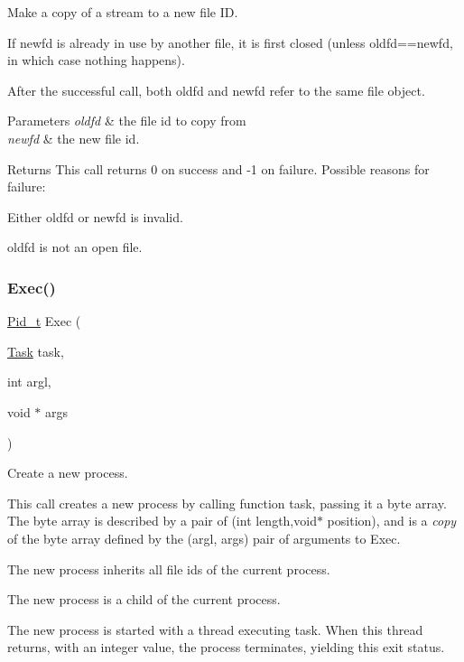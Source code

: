 Make a copy of a stream to a new file ID. 

If {\ttfamily newfd} is already in use by another file, it is first closed (unless {\ttfamily oldfd==newfd}, in which case nothing happens).

After the successful call, both oldfd and newfd refer to the same file object.


\begin{DoxyParams}{Parameters}
{\em oldfd} & the file id to copy from \\
\hline
{\em newfd} & the new file id. \\
\hline
\end{DoxyParams}
\begin{DoxyReturn}{Returns}
This call returns 0 on success and -\/1 on failure. Possible reasons for failure\+:
\begin{DoxyItemize}
\item Either oldfd or newfd is invalid.
\item oldfd is not an open file. 
\end{DoxyItemize}
\end{DoxyReturn}
\mbox{\label{group__syscalls_ga737ad30d8105b4b76e3eb102dd016404}} 
\subsubsection{\texorpdfstring{Exec()}{Exec()}}
{\footnotesize\ttfamily \hyperlink{group__syscalls_gafac07f3170763932fac97b6eab2c3984}{Pid\+\_\+t} Exec (\begin{DoxyParamCaption}\item[{\hyperlink{group__syscalls_gaec3f2f835e105271fbbc00272c0ba984}{Task}}]{task,  }\item[{int}]{argl,  }\item[{void $\ast$}]{args }\end{DoxyParamCaption})}



Create a new process. 

This call creates a new process by calling function {\ttfamily task}, passing it a byte array. The byte array is described by a pair of (int length,void$\ast$ position), and is a {\itshape copy} of the byte array defined by the (argl, args) pair of arguments to Exec.


\begin{DoxyItemize}
\item The new process inherits all file ids of the current process.
\item The new process is a child of the current process.
\item The new process is started with a thread executing {\ttfamily task}. When this thread returns, with an integer value, the process terminates, yielding this exit status.
\end{DoxyItemize}


